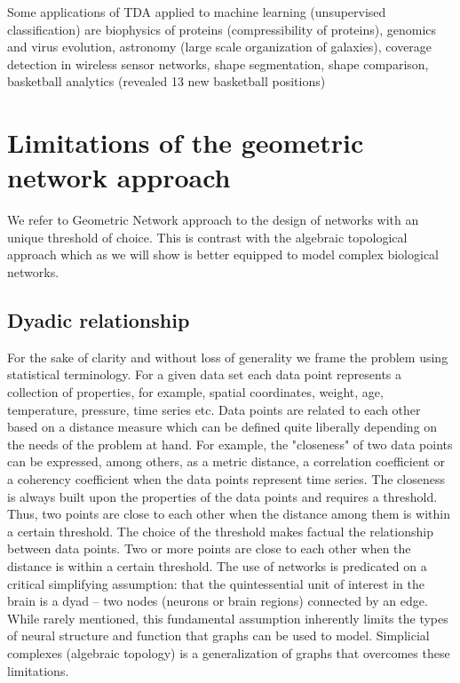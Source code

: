 \documentclass[onecollarge,runningheads]{svjour2}
\begin{document}
Some applications of TDA applied to machine learning (unsupervised classification) are biophysics of proteins (compressibility of proteins), genomics and virus evolution, astronomy (large scale organization of galaxies), coverage detection in wireless sensor networks, shape segmentation, shape comparison, basketball analytics (revealed 13 new basketball positions) %



\section{Limitations of the geometric network approach}
\label{se:limita}
We refer to Geometric Network approach to the design of networks with an unique threshold of choice. This is contrast with the algebraic topological approach which as we will show is better equipped to model complex biological networks. 

\subsection{Dyadic relationship}
For the sake of clarity and without loss of generality we frame the problem using statistical terminology.
For a given data set each data point represents a collection of properties, for example, spatial coordinates, weight, age, temperature, pressure, time series etc. Data points are related to each other based on a distance measure which can be defined quite liberally depending on the needs of the problem at hand. For example, the "closeness" of two data points can be expressed, among others, as a metric distance, a correlation coefficient or a coherency coefficient when the data points represent time series.
The closeness is always built upon the properties of the data points and requires a threshold. Thus, two points are close to each other when the distance among them is within a certain threshold. The choice of the threshold makes factual the relationship between data points. Two or more points are close to each other when the distance is within a certain threshold.
\cite{giusti2016two} The use of networks is predicated on a critical simplifying assumption: that the quintessential unit of interest in the brain is a dyad – two nodes (neurons or brain regions) connected by an edge. While rarely mentioned, this fundamental assumption inherently
limits the types of neural structure and function that graphs can be used to model. Simplicial complexes (algebraic topology) is a generalization of graphs that overcomes these limitations.
\end{document}
